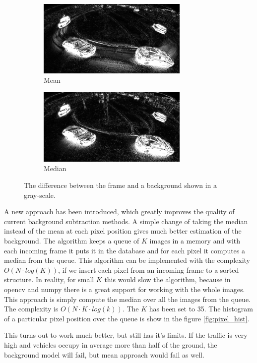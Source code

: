 \documentclass[a4paper,12pt,titlepage, twoside]{article}
\numberwithin{figure}{section}
\begin{document}
\begin{figure}
    \begin{subfigure}[Sample1]{0.5\linewidth}
        \includegraphics[height=37mm]{fig/threshold_mean_crop.png}
        \caption{Mean}
        \label{fig:threshold_mean}
    \end{subfigure}
    \qquad
    \begin{subfigure}[Sample1]{0.5\linewidth}    
        \includegraphics[height=37mm]{fig/threshold_med_crop.png}
        \caption{Median}
        \label{fig:threshold_med}    
    \end{subfigure} 
    \caption{The difference between the frame and a background shown in a gray-scale.}
\end{figure}

A new approach has been introduced, which greatly improves the quality of current background subtraction methods. A simple change of taking the median instead of the mean at each pixel position gives much better estimation of the background. The algorithm keeps a queue of $K$ images in a memory and with each incoming frame it puts it in the database and for each pixel it computes a median from the queue. This algorithm can be implemented with the complexity $O(N \cdot log(K))$, if we insert each pixel from an incoming frame to a sorted structure. In reality, for small $K$ this would slow the algorithm, because in opencv and numpy there is a great support for working with the whole images. This approach is simply compute the median over all the images from the queue. The complexity is $O(N \cdot K \cdot log(k)).$ The $K$ has been set to 35. The histogram of a particular pixel position over the queue is show in the figure \ref{fig:pixel_hist}.


This turns out to work much better, but still has it's limits. If the traffic is very high and vehicles occupy in average more than half of the ground, the background model will fail, but mean approach would fail as well. 
\end{document}
